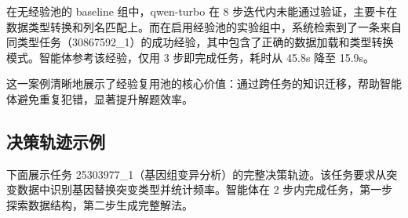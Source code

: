在无经验池的 baseline 组中，qwen-turbo 在 8 步迭代内未能通过验证，主要卡在数据类型转换和列名匹配上。而在启用经验池的实验组中，系统检索到了一条来自同类型任务（30867592\_1）的成功经验，其中包含了正确的数据加载和类型转换模式。智能体参考该经验，仅用 3 步即完成任务，耗时从 45.8s 降至 15.9s。

这一案例清晰地展示了经验复用池的核心价值：通过跨任务的知识迁移，帮助智能体避免重复犯错，显著提升解题效率。

\subsection{决策轨迹示例}

下面展示任务 25303977\_1（基因组变异分析）的完整决策轨迹。该任务要求从突变数据中识别基因替换突变类型并统计频率。智能体在 2 步内完成任务，第一步探索数据结构，第二步生成完整解法。

